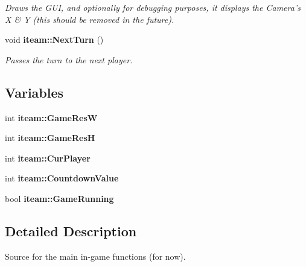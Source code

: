 \begin{CompactItemize}
\begin{CompactList}\small\item\em Draws the GUI, and optionally for debugging purposes, it displays the Camera's X \& Y (this should be removed in the future). \item\end{CompactList}\item 
void {\bf iteam::NextTurn} ()\label{namespaceiteam_9e23f9d383055dc5f46065e6fec82aa6}

\begin{CompactList}\small\item\em Passes the turn to the next player. \item\end{CompactList}\end{CompactItemize}
\subsection*{Variables}
\begin{CompactItemize}
\item 
int {\bf iteam::GameResW}
\item 
int {\bf iteam::GameResH}
\item 
int {\bf iteam::CurPlayer}
\item 
int {\bf iteam::CountdownValue}
\item 
bool {\bf iteam::GameRunning}
\end{CompactItemize}


\subsection{Detailed Description}
Source for the main in-game functions (for now). 

